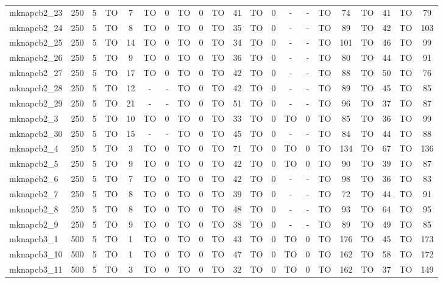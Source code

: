 \begin{sidewaystable}[!ht]
{\begin{tabular}{lcccccccccccccccccccc}
mknapcb2\_23 & 250 & 5 & TO & 7 & TO & 0 & TO & 0 & TO & 41 & TO & 0 &  - &  - & TO & 74 & TO & 41 & TO & 79 \\
mknapcb2\_24 & 250 & 5 & TO & 8 & TO & 0 & TO & 0 & TO & 35 & TO & 0 &  - &  - & TO & 89 & TO & 42 & TO & 103 \\
mknapcb2\_25 & 250 & 5 & TO & 14 & TO & 0 & TO & 0 & TO & 34 & TO & 0 &  - &  - & TO & 101 & TO & 46 & TO & 99 \\
mknapcb2\_26 & 250 & 5 & TO & 9 & TO & 0 & TO & 0 & TO & 36 & TO & 0 &  - &  - & TO & 80 & TO & 44 & TO & 91 \\
mknapcb2\_27 & 250 & 5 & TO & 17 & TO & 0 & TO & 0 & TO & 42 & TO & 0 &  - &  - & TO & 88 & TO & 50 & TO & 76 \\
mknapcb2\_28 & 250 & 5 & TO & 12 &  - &  - & TO & 0 & TO & 42 & TO & 0 &  - &  - & TO & 89 & TO & 45 & TO & 85 \\
mknapcb2\_29 & 250 & 5 & TO & 21 &  - &  - & TO & 0 & TO & 51 & TO & 0 &  - &  - & TO & 96 & TO & 37 & TO & 87 \\
mknapcb2\_3 & 250 & 5 & TO & 10 & TO & 0 & TO & 0 & TO & 33 & TO & 0 & TO & 0 & TO & 85 & TO & 36 & TO & 99 \\
mknapcb2\_30 & 250 & 5 & TO & 15 &  - &  - & TO & 0 & TO & 45 & TO & 0 &  - &  - & TO & 84 & TO & 44 & TO & 88 \\
mknapcb2\_4 & 250 & 5 & TO & 3 & TO & 0 & TO & 0 & TO & 71 & TO & 0 & TO & 0 & TO & 134 & TO & 67 & TO & 136 \\
mknapcb2\_5 & 250 & 5 & TO & 9 & TO & 0 & TO & 0 & TO & 42 & TO & 0 & TO & 0 & TO & 90 & TO & 39 & TO & 87 \\
mknapcb2\_6 & 250 & 5 & TO & 7 & TO & 0 & TO & 0 & TO & 42 & TO & 0 &  - &  - & TO & 98 & TO & 36 & TO & 83 \\
mknapcb2\_7 & 250 & 5 & TO & 8 & TO & 0 & TO & 0 & TO & 39 & TO & 0 &  - &  - & TO & 72 & TO & 44 & TO & 91 \\
mknapcb2\_8 & 250 & 5 & TO & 8 & TO & 0 & TO & 0 & TO & 48 & TO & 0 &  - &  - & TO & 93 & TO & 64 & TO & 95 \\
mknapcb2\_9 & 250 & 5 & TO & 9 & TO & 0 & TO & 0 & TO & 38 & TO & 0 &  - &  - & TO & 89 & TO & 49 & TO & 85 \\
mknapcb3\_1 & 500 & 5 & TO & 1 & TO & 0 & TO & 0 & TO & 43 & TO & 0 & TO & 0 & TO & 176 & TO & 45 & TO & 173 \\
mknapcb3\_10 & 500 & 5 & TO & 1 & TO & 0 & TO & 0 & TO & 47 & TO & 0 & TO & 0 & TO & 162 & TO & 58 & TO & 172 \\
mknapcb3\_11 & 500 & 5 & TO & 3 & TO & 0 & TO & 0 & TO & 32 & TO & 0 & TO & 0 & TO & 162 & TO & 37 & TO & 149 \\

\end{tabular}}
\end{sidewaystable}
